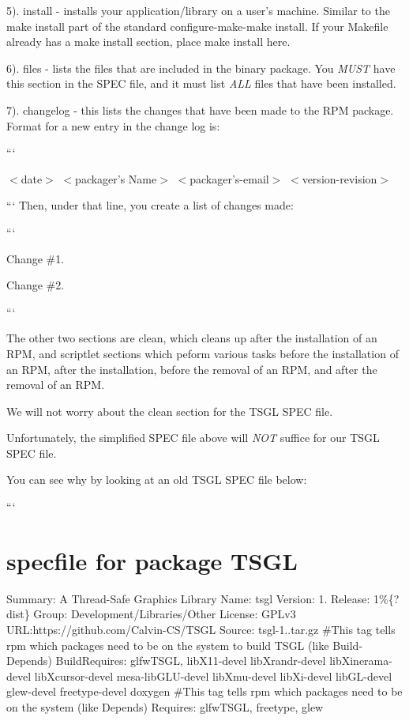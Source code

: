 5). {\ttfamily install} -\/ installs your application/library on a user's machine. Similar to the make install part of the standard configure-\/make-\/make install. If your Makefile already has a make install section, place make install here.

6). {\ttfamily files} -\/ lists the files that are included in the binary package. You {\itshape M\-U\-S\-T} have this section in the S\-P\-E\-C file, and it must list {\itshape A\-L\-L} files that have been installed.

7). {\ttfamily changelog} -\/ this lists the changes that have been made to the R\-P\-M package. Format for a new entry in the change log is\-:

```
\begin{DoxyItemize}
\item $<$date$>$ $<$packager's Name$>$ $<$packager's-\/email$>$ $<$version-\/revision$>$
\end{DoxyItemize}

``` Then, under that line, you create a list of changes made\-:

```
\begin{DoxyItemize}
\item Change \#1.
\item Change \#2.
\end{DoxyItemize}```

The other two sections are {\ttfamily clean}, which cleans up after the installation of an R\-P\-M, and scriptlet sections which peform various tasks before the installation of an R\-P\-M, after the installation, before the removal of an R\-P\-M, and after the removal of an R\-P\-M.

We will not worry about the {\ttfamily clean} section for the T\-S\-G\-L S\-P\-E\-C file.

Unfortunately, the simplified S\-P\-E\-C file above will {\itshape N\-O\-T} suffice for our T\-S\-G\-L S\-P\-E\-C file.

You can see why by looking at an old T\-S\-G\-L S\-P\-E\-C file below\-:

```

\section*{specfile for package T\-S\-G\-L}

Summary\-: A Thread-\/\-Safe Graphics Library Name\-: tsgl Version\-: 1. Release\-: 1\%\{?dist\} Group\-: Development/\-Libraries/\-Other License\-: G\-P\-Lv3 U\-R\-L\-:https\-://github.com/\-Calvin-\/\-C\-S/\-T\-S\-G\-L Source\-: tsgl-\/1..\-tar.\-gz \#\-This tag tells rpm which packages need to be on the system to build T\-S\-G\-L (like Build-\/\-Depends) Build\-Requires\-: glfw\-T\-S\-G\-L, lib\-X11-\/devel lib\-Xrandr-\/devel lib\-Xinerama-\/devel lib\-Xcursor-\/devel mesa-\/lib\-G\-L\-U-\/devel lib\-Xmu-\/devel lib\-Xi-\/devel lib\-G\-L-\/devel glew-\/devel freetype-\/devel doxygen \#\-This tag tells rpm which packages need to be on the system (like Depends) Requires\-: glfw\-T\-S\-G\-L, freetype, glew

